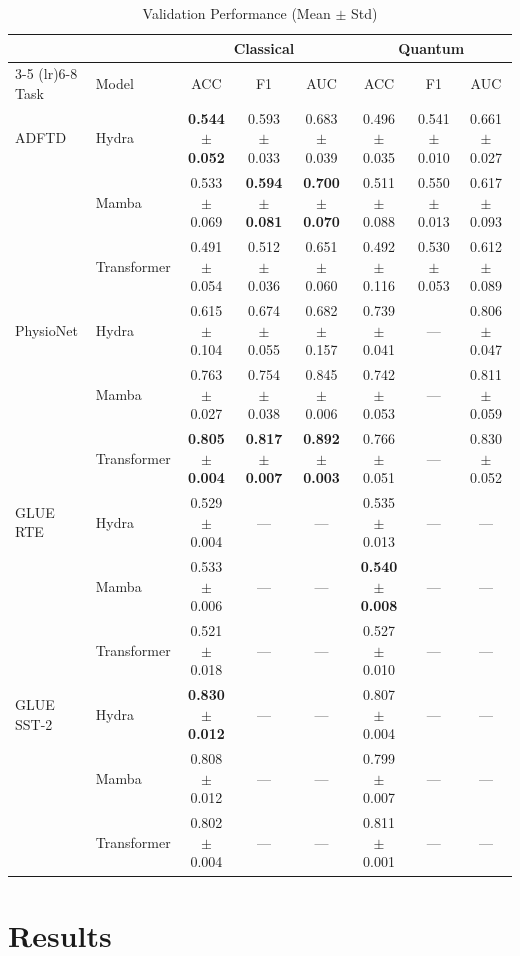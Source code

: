 \documentclass[conference]{IEEEtran}
\begin{document}
\begin{table}[t]
\centering
\caption{Validation Performance (Mean $\pm$ Std)}
\label{tab:val_results}
\renewcommand{\arraystretch}{1.2}
\begin{tabular}{ll ccc ccc}
\toprule
& & \multicolumn{3}{c}{Classical} & \multicolumn{3}{c}{Quantum} \\
\cmidrule(lr){3-5} \cmidrule(lr){6-8}
Task & Model & ACC & F1 & AUC & ACC & F1 & AUC \\
\midrule
ADFTD
 & Hydra
   & \textbf{0.544 $\pm$ 0.052} & 0.593 $\pm$ 0.033 & 0.683 $\pm$ 0.039
   & 0.496 $\pm$ 0.035 & 0.541 $\pm$ 0.010 & 0.661 $\pm$ 0.027 \\
 & Mamba
   & 0.533 $\pm$ 0.069 & \textbf{0.594 $\pm$ 0.081} & \textbf{0.700 $\pm$ 0.070}
   & 0.511 $\pm$ 0.088 & 0.550 $\pm$ 0.013 & 0.617 $\pm$ 0.093 \\
 & Transformer
   & 0.491 $\pm$ 0.054 & 0.512 $\pm$ 0.036 & 0.651 $\pm$ 0.060
   & 0.492 $\pm$ 0.116 & 0.530 $\pm$ 0.053  & 0.612 $\pm$ 0.089 \\
\midrule
PhysioNet
 & Hydra
   & 0.615 $\pm$ 0.104 & 0.674 $\pm$ 0.055 & 0.682 $\pm$ 0.157
   & 0.739 $\pm$ 0.041 & --- & 0.806 $\pm$ 0.047 \\
 & Mamba
   & 0.763 $\pm$ 0.027 & 0.754 $\pm$ 0.038 & 0.845 $\pm$ 0.006
   & 0.742 $\pm$ 0.053 & --- & 0.811 $\pm$ 0.059 \\
 & Transformer
   & \textbf{0.805 $\pm$ 0.004} & \textbf{0.817 $\pm$ 0.007} & \textbf{0.892 $\pm$ 0.003}
   & 0.766 $\pm$ 0.051 & --- & 0.830 $\pm$ 0.052 \\
\midrule
GLUE RTE
 & Hydra
   & 0.529 $\pm$ 0.004 & --- & ---
   & 0.535 $\pm$ 0.013 & --- & --- \\
 & Mamba
   & 0.533 $\pm$ 0.006 & --- & ---
   & \textbf{0.540 $\pm$ 0.008} & --- & --- \\
 & Transformer
   & 0.521 $\pm$ 0.018 & --- & ---
   & 0.527 $\pm$ 0.010 & --- & --- \\
\midrule
GLUE SST-2
 & Hydra
   & \textbf{0.830 $\pm$ 0.012} & --- & ---
   & 0.807 $\pm$ 0.004 & --- & --- \\
 & Mamba
   & 0.808 $\pm$ 0.012 & --- & ---
   & 0.799 $\pm$ 0.007 & --- & --- \\
 & Transformer
   & 0.802 $\pm$ 0.004 & --- & ---
   & 0.811 $\pm$ 0.001 & --- & --- \\
\bottomrule
\end{tabular}
\end{table}

\section{Results}
\end{document}
